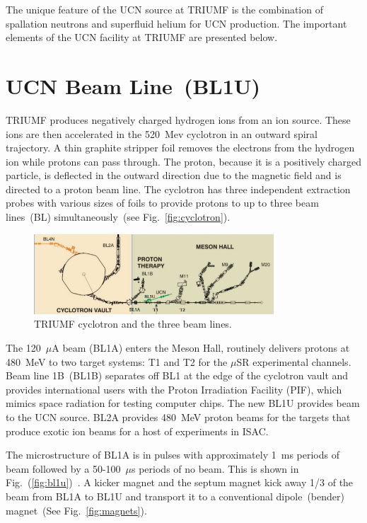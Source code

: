 The unique feature of the UCN source at TRIUMF is the combination of
spallation neutrons and superfluid helium for UCN production. The
important elements of the UCN facility at TRIUMF are presented below.

\section{UCN Beam Line~(BL1U)}
TRIUMF produces negatively charged hydrogen ions from an ion
source. These ions are then accelerated in the 520~Mev cyclotron in an
outward spiral trajectory. A thin graphite stripper foil removes the
electrons from the hydrogen ion while protons can pass through. The
proton, because it is a positively charged particle, is deflected in
the outward direction due to the magnetic field and is directed to a
proton beam line. The cyclotron has three independent extraction
probes with various sizes of foils to provide protons to up to three
beam lines~(BL) simultaneously~(see Fig.~\ref{fig:cyclotron}).

\begin{figure}[h!]
  \centering
  \includegraphics[width=0.8\textwidth]{cyclotron.png}
  \caption{TRIUMF cyclotron and the three beam lines.}
  \label{fig:sitemap}
\end{figure}


The 120~$\mu$A beam (BL1A) enters the Meson Hall, routinely delivers
protons at 480~MeV to two target systems: T1 and T2 for the $\mu$SR
experimental channels. Beam line 1B~(BL1B) separates off BL1 at the
edge of the cyclotron vault and provides international users with the
Proton Irradiation Facility (PIF), which mimics space radiation for
testing computer chips.  The new BL1U provides beam to the UCN
source. BL2A provides 480~MeV proton beams for the targets that
produce exotic ion beams for a host of experiments in ISAC.


The microstructure of BL1A is in pulses with approximately 1~ms
periods of beam followed by a 50-100~$\mu$s periods of no beam.  This
is shown in Fig.~(\ref{fig:bl1u})~\cite{Nick_thesis}.  A kicker magnet
and the septum magnet kick away 1/3 of the beam from BL1A to BL1U and
transport it to a conventional dipole~(bender) magnet~(See
Fig.~\ref{fig:magnets}).

